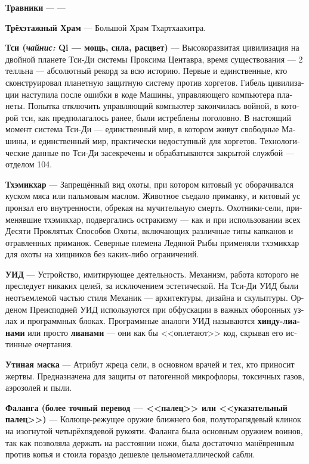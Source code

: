 \documentclass[a4paper,12pt,fleqn]{book}\usepackage{polyglossia}\setdefaultlanguage[babelshorthands=true]{russian}\setotherlanguage{english}\defaultfontfeatures{Ligatures=TeX,Mapping=tex-text}\usepackage{xcolor}\newcommand{\ml}[3]{#2}
\newcommand{\theterm}[3]{\textbf{\hypertarget{#1}{#2}} --- #3}
\newcommand{\theorigin}[3]{\textit{#1:} #2 --- #3}
\begin{document}
{\theterm{grasshider}
{Травники}
{---}

\theterm{three-storey-temple} %
{Трёхэтажный Храм}
{Большой Храм Тхартхаахитра.}

\theterm{qi-people}
{Тси (\theorigin{чайнис}{Qi}{мощь, сила, расцвет})}
{Высокоразвитая цивилизация на двойной планете Тси-Ди системы Проксима Центавра, время существования --- 2 телльна --- абсолютный рекорд за всю историю.
Первые и единственные, кто сконструировал планетную защитную систему против хоргетов.
Гибель цивилизации наступила после ошибки в коде Машины, управляющего компьютера планеты.
Попытка отключить управляющий компьютер закончилась войной, в которой тси, как предполагалось ранее, были истреблены поголовно.
В настоящий момент система Тси-Ди --- единственный мир, в котором живут свободные Машины, и единственный мир, практически недоступный для хоргетов.
Технологические данные по Тси-Ди засекречены и обрабатываются закрытой службой --- отделом 104.}

\theterm{tchoemikchar}
{Тхэмикхар}
{Запрещённый вид охоты, при котором китовый ус оборачивался куском мяса или пальмовым маслом.
Животное съедало приманку, и китовый ус пронзал его внутренности, обрекая на мучительную смерть.
Охотники-сели, применявшие тхэмикхар, подвергались остракизму --- как и при использовании всех Десяти Проклятых Способов Охоты, включающих различные типы капканов и отравленных приманок.
Северные племена Ледяной Рыбы применяли тхэмикхар для охоты на хищников без каких-либо ограничений.}

\theterm{AID}
{УИД}
{Устройство, имитирующее деятельность.
Механизм, работа которого не преследует никаких целей, за исключением эстетической.
На Тси-Ди УИД были неотъемлемой частью стиля Механик --- архитектуры, дизайна и скульптуры.
Орденом Преисподней УИД используются при обфускации в важных оборонных узлах и программных блоках.
Программные аналоги УИД называются \textbf{хинду-лианами} или просто \textbf{лианами} --- они как бы <<оплетают>> код, скрывая его истинные очертания.}

\theterm{duck-mask}
{Утиная маска}
{Атрибут жреца сели, в основном врачей и тех, кто приносит жертвы.
Предназначена для защиты от патогенной микрофлоры, токсичных газов, аэрозолей и пыли.}

\theterm{phalanx}
{Фаланга (более точный перевод --- <<палец>> или <<указательный палец>>)}
{Колюще-режущее оружие ближнего боя, полуторапядевый клинок на изогнутой четырёхпядевой рукояти.
Фаланга была основным оружием воинов, так как позволяла держать на расстоянии ножи, была достаточно манёвренным против копья и стоила гораздо дешевле цельнометаллической сабли.}

}
\end{document}
